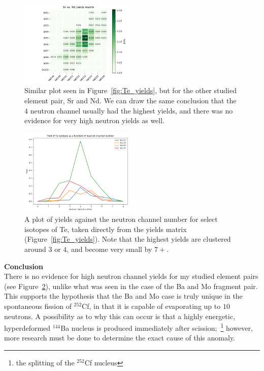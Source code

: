 \documentclass[12pt, letterpaper, twocolumn]{article}
\begin{document}
\begin{figure}[ht]
    \centering
    \includegraphics[width=0.49\textwidth]{img/nd_yields_matrix_heatmap.png}
    \caption{Similar plot seen in Figure~\ref{fig:Te_yields}, but for the other studied element pair, Sr and Nd. We can draw the same conclusion that the $4$ neutron channel usually had the highest yields, and there was no evidence for very high neutron yields as well.}
    \label{fig:Nd_yields}
\end{figure}

\begin{figure}[ht]
    \centering
    \includegraphics[width=0.49\textwidth]{img/neutron_channel.png}
    \caption{A plot of yields against the neutron channel number for select isotopes of Te, taken directly from the yields matrix (Figure~\ref{fig:Te_yields}). Note that the highest yields are clustered around $3$ or $4$, and become very small by $7+$.}
    \label{fig:channel}
\end{figure}

\vspace{0.125in}
\noindent\textbf{Conclusion}\\
There is no evidence for high neutron channel yields for my studied element pairs (see Figure~\ref{fig:channel}), unlike what was seen in the case of the Ba and Mo fragment pair. This supports the hypothesis that the Ba and Mo case is truly unique in the spontaneous fission of $^{252}$Cf, in that it is capable of evaporating up to $10$ neutrons. A possibility as to why this can occur is that a highly energetic, hyperdeformed $^{144}$Ba nucleus is produced immediately after scission;~\footnote{the splitting of the $^{252}$Cf nucleus} however, more research must be done to determine the exact cause of this anomaly.
\end{document}
